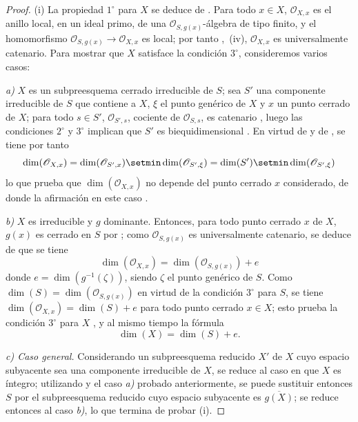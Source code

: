 \begin{proof}
(i) La propiedad $1^\circ$ para $X$ se deduce de .
Para todo $x\in X$, $\mathcal O_{X,x}$ es el anillo local, en un ideal primo, de una $\mathcal O_{S,g(x)}$-álgebra de tipo finito, y el homomorfismo $\mathcal O_{S,g(x)}\to\mathcal O_{X,x}$
es local; por tanto ,~(iv), $\mathcal O_{X,x}$ es universalmente catenario.
Para mostrar que $X$ satisface la condición $3^\circ$, consideremos varios casos:

\emph{a)} $X$ es un subpreesquema cerrado irreducible de $S$; sea $S'$ una componente irreducible de $S$ que contiene a $X$, $\xi$ el punto genérico de $X$ y $x$ un punto cerrado de $X$; para todo $s\in S'$, $\mathcal O_{S',s}$, cociente de $\mathcal O_{S,s}$, es catenario , luego las condiciones $2^\circ$ y $3^\circ$ implican que $S'$ es biequidimensional .
En virtud de  y de , se tiene por tanto
\[
  \dim(\mathcal O_{X,x})=\dim(\mathcal O_{S',x})\setmin\dim(\mathcal O_{S',\xi})
  =\dim(S')\setmin\dim(\mathcal O_{S',\xi})
\]
lo que prueba que $\dim(\mathcal O_{X,x})$ no depende del punto cerrado $x$ considerado, de donde la afirmación en este caso .

\emph{b)} $X$ es irreducible y $g$ dominante.
Entonces, para todo punto cerrado $x$ de $X$, $g(x)$ es cerrado en $S$ por ; como $\mathcal O_{S,g(x)}$ es universalmente catenario, se deduce de  que se tiene
\[
  \dim(\mathcal O_{X,x})=\dim(\mathcal O_{S,g(x)})+e
\]
donde $e=\dim(g^{-1}(\zeta))$, siendo $\zeta$ el punto genérico de $S$.
Como $\dim(S)=\dim(\mathcal O_{S,g(x)})$ en virtud de la condición $3^\circ$ para $S$, se tiene $\dim(\mathcal O_{X,x})=\dim(S)+e$ para todo punto cerrado $x\in X$; esto prueba la condición $3^\circ$ para $X$ , y al mismo tiempo la fórmula
\begin{equation}
\label{IV.10.6.1.4-fr}
\tag{10.6.1.4}
\dim(X)=\dim(S)+e.
\end{equation}

\emph{c) Caso general.}
Considerando un subpreesquema reducido $X'$ de $X$ cuyo espacio subyacente sea una componente irreducible de $X$, se reduce al caso en que $X$ es íntegro; utilizando  y el caso \emph{a)} probado anteriormente, se puede sustituir entonces $S$ por el subpreesquema reducido cuyo espacio subyacente es $\overline{g(X)}$; se reduce entonces al caso \emph{b)}, lo que termina de probar (i).


\end{proof}
